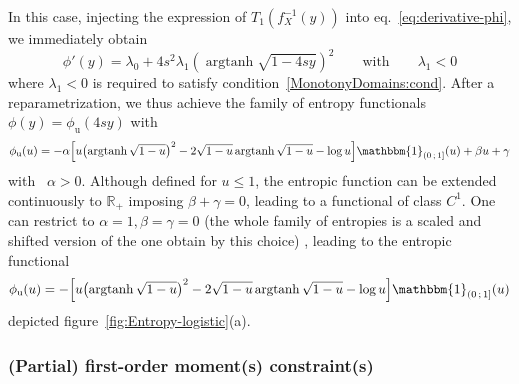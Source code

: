\documentclass[entropy,article,submit,moreauthors,pdftex]{Definitions/mdpi}
\newcommand{\SZ}[1]{{\color{blue} #1}}                                       %
\def\Rset{\mathbb{R}}%
\def\X{\mathcal{X}}%
\def\un{\mathbbm{1}}%
\def\argtanh{\operatorname{argtanh}}%
\begin{document}
In this  case, \SZ{injecting the  expression of $T_1\left(  f_X^{-1}(y) \right)$
  into   eq.~\eqref{eq:derivative-phi},   we   immediately   obtain
%
\[
\phi'(y) = \lambda_0 + 4 s^2 \lambda_1 \left( \argtanh\sqrt{1 - 4 s y} \right)^2
\qquad \mbox{with} \qquad \lambda_1 < 0
\]
%
where      $\lambda_1      <      0$       is      required      to      satisfy
condition~\ref{MonotonyDomains:cond}.
%
After a  reparametrization, we  thus achieve the  family of  entropy functionals
$\phi(y) = \phi_{\mathrm{u}}(4 s y)$ with
%
\[
\phi_{\mathrm{u}}(u)  =   -\alpha  \left[   u  \left(
  \argtanh\sqrt{1-u}  \right)^2  -  2  \sqrt{1-u} \argtanh\sqrt{1-u}  -  \log  u
  \right] \un_{\left( 0 \, ; \, 1 \right]}(u) + \beta u + \gamma
\]
%
with \ $\alpha >  0$. Although defined for $u \le 1$,  the entropic function can
be extended continuously to $\Rset_+$ imposing  $\beta + \gamma = 0$, leading to
a functional of class  $C^1$. One can restrict to $\alpha = 1,  \beta = \gamma =
0$ (the  whole family of entropies  is a scaled  and shifted version of  the one
obtain by this choice) , leading to the entropic functional
%
\[
\phi_{\mathrm{u}}(u)  =  - \left[  u  \left(  \argtanh\sqrt{1-u} \right)^2  -  2
  \sqrt{1-u}  \argtanh\sqrt{1-u} -  \log  u  \right] \un_{\left(  0  \,  ; \,  1
  \right]}(u)
\]
%
depicted figure~\ref{fig:Entropy-logistic}(a).
}



\subsubsection{(Partial) first-order moment(s) constraint(s)}
\label{subsubsecapp:LogisticFirstPartial}
\end{document}
